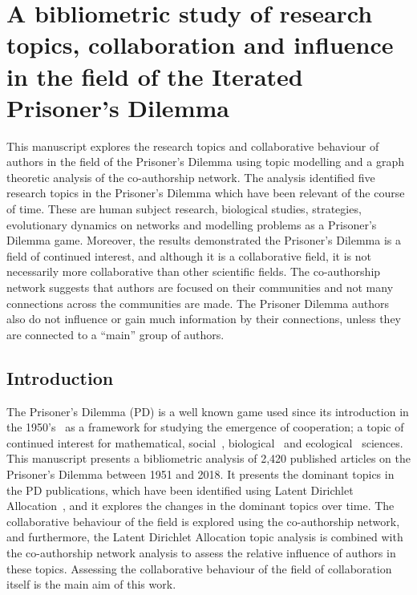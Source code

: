 \chapter{A bibliometric study of research topics, collaboration and influence in
the field of the Iterated Prisoner's Dilemma}\label{chapter:bibliometric_study}

This manuscript explores the research topics and collaborative behaviour of
authors in the field of the Prisoner's Dilemma using topic modelling and a graph
theoretic analysis of the co-authorship network. The analysis identified five
research topics in the Prisoner's Dilemma which have been relevant of the course
of time. These are human subject research, biological studies, strategies,
evolutionary dynamics on networks and modelling problems as a Prisoner's Dilemma
game. Moreover, the results demonstrated the Prisoner's Dilemma is a field of
continued interest, and although it is a collaborative field, it is not
necessarily more collaborative than other scientific fields. The co-authorship
network suggests that authors are focused on their communities and not many
connections across the communities are made. The Prisoner Dilemma authors also
do not influence or gain much information by their connections, unless they are
connected to a ``main'' group of authors.

\section{Introduction}\label{section:introduction}

The Prisoner's Dilemma (PD) is a well known game used since its introduction in
the 1950's~\cite{Flood1958} as a framework for studying the emergence of
cooperation; a topic of continued interest for mathematical,
social~\cite{Perc2008}, biological~\cite{turner1999prisoner} and
ecological~\cite{Wu2011} sciences. This manuscript presents a bibliometric
analysis of 2,420 published articles on the Prisoner's Dilemma between 1951 and
2018. It presents the dominant topics in the PD publications, which have been
identified using Latent Dirichlet Allocation~\cite{Blei2003}, and it explores the changes in the
dominant topics over time. The collaborative behaviour of the field is explored
using the co-authorship network, and furthermore, the Latent Dirichlet
Allocation topic analysis is combined with the co-authorship network analysis to assess
the relative influence of authors in these topics. Assessing the collaborative
behaviour of the field of collaboration itself is the main aim of this work.

